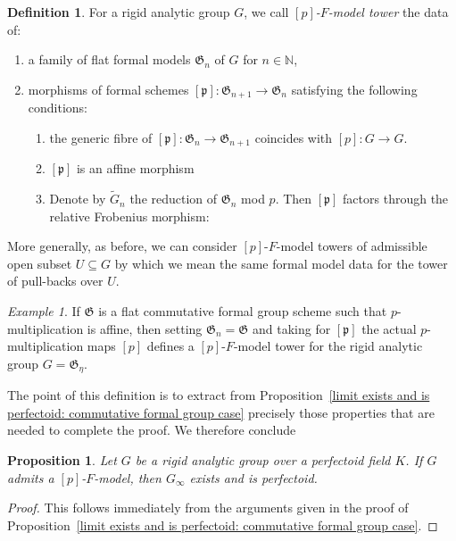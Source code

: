 \documentclass[11pt,oneside]{amsart}
\newtheorem{proposition}[theorem]{Proposition}
\theoremstyle{definition}
\newtheorem{definition}[theorem]{Definition}
\theoremstyle{remark}
\newtheorem*{example}{Example}
\begin{document}
	\begin{definition}
		For a rigid analytic group $G$, we call \textit{$[p]$-$F$-model tower} the data of:
		\begin{enumerate}
			\item a family of flat formal models $\mathfrak G_n$ of $G$ for $n\in \mathbb N$,
			\item morphisms of formal schemes $[\mathfrak p]:\mathfrak G_{n+1}\rightarrow \mathfrak G_{n}$ satisfying the following conditions:
			\begin{enumerate}
				\item the generic fibre of $[\mathfrak p]:\mathfrak G_n\rightarrow \mathfrak G_{n+1}$ coincides with $[p]:G\rightarrow G$. 
				\item $[\mathfrak p]$ is an affine morphism
				\item Denote by $\tilde{G}_n$ the reduction of $\mathfrak G_n$ mod $p$. Then $[\mathfrak p]$ factors through the relative Frobenius morphism:
				\begin{center}
				\end{center}
				
			\end{enumerate}
			
			 
		\end{enumerate}
	\end{definition}
	More generally, as before, we can consider $[p]$-$F$-model towers of admissible open subset $U\subseteq G$ by which we mean the same formal model data for the tower of pull-backs over $U$.
	
	\begin{example}
		If $\mathfrak G$ is a flat commutative formal group scheme such that $p$-multiplication is affine, then setting $\mathfrak G_n = \mathfrak G$ and taking for $[\mathfrak p]$ the actual $p$-multiplication maps $[p]$ defines a $[p]$-$F$-model tower for the rigid analytic group $G=\mathfrak G_\eta$.
	\end{example}
	The point of this definition is to extract from Proposition~\ref{limit exists and is perfectoid: commutative formal group case} precisely those properties that are needed to complete the proof. We therefore conclude
	\begin{proposition}\label{existence of p-F-model tower implies perfectoid}
		Let $G$ be a rigid analytic group over a perfectoid field $K$. If $G$ admits a $[p]$-$F$-model, then $G_\infty$ exists and is perfectoid.
	\end{proposition}
	\begin{proof}
		This follows immediately from the arguments given in the proof of Proposition~\ref{limit exists and is perfectoid: commutative formal group case}.
	\end{proof}
	
\end{document}
